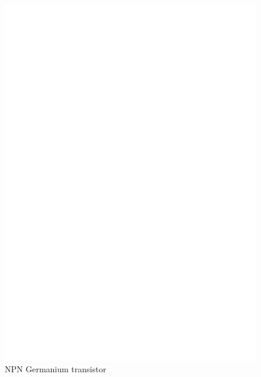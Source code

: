 \begin{figure}[H]
\centering
\includegraphics[]{../FIG/BJT_AD161.eps}
\caption{NPN Germanium transistor}
\label{fig:BJT-NPN-Ge}
\end{figure}


